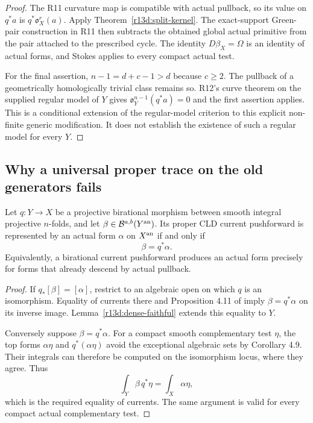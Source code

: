 \begin{proof}
The R11 curvature map is compatible with actual pullback, so its
value on $q^*a$ is $q^*\mathfrak o_X^r(a)$.  Apply
Theorem~\ref{r13d:split-kernel}.  The exact-support Green-pair
construction in R11 then subtracts the obtained global actual
primitive from the pair attached to the prescribed cycle.  The
identity $D\beta_X=\Omega$ is an identity of actual forms, and
Stokes applies to every compact actual test.

For the final assertion, $n-1=d+c-1>d$ because $c\geq2$.
The pullback of a geometrically homologically trivial class remains
so.  R12's curve theorem on the supplied regular model of $Y$ gives
$\mathfrak o_Y^{n-1}(q^*a)=0$ and the first assertion applies.
This is a conditional extension of the regular-model criterion to
this explicit non-finite generic modification.  It does not establish
the existence of such a regular model for every $Y$.
\end{proof}

\subsection{Why a universal proper trace on the old generators fails}

\begin{proposition}
\label{r13d:range}
Let $q:Y\to X$ be a projective birational morphism between smooth
integral projective $n$-folds, and let
$\beta\in\mathcal B^{a,b}(Y^{\rm an})$.  Its proper CLD current pushforward
is represented by an actual form $\alpha$ on $X^{\rm an}$ if and
only if
\[
                                 \beta=q^*\alpha.
\tag{R13.D12}\label{r13d:actual-range}
\]
Equivalently, a birational current pushforward produces an actual
form precisely for forms that already descend by actual pullback.
\end{proposition}

\begin{proof}
If $q_*[\beta]=[\alpha]$, restrict to an algebraic open on which
$q$ is an isomorphism.  Equality of currents there and Proposition
4.11 of \cite{M} imply $\beta=q^*\alpha$ on its inverse image.
Lemma~\ref{r13d:dense-faithful} extends this equality to $Y$.

Conversely suppose $\beta=q^*\alpha$.  For a compact smooth
complementary test $\eta$, the top forms $\alpha\eta$ and
$q^*(\alpha\eta)$ avoid the exceptional algebraic sets by
Corollary 4.9.  Their integrals can therefore be computed on the
isomorphism locus, where they agree.  Thus
\[
             \int_Y\beta\,q^*\eta=\int_X\alpha\eta,
\]
which is the required equality of currents.  The same argument is
valid for every compact actual complementary test.
\end{proof}


